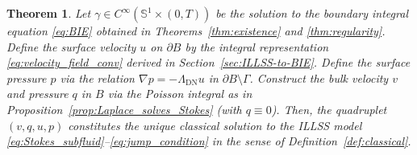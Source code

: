 \documentclass{article}
\newtheorem{theorem}{Theorem}[section]
\theoremstyle{remark}
\theoremstyle{definition}
\numberwithin{equation}{section}
\begin{document}
\begin{theorem}
    \label{thm:existence_ILLSS}
    Let $\gamma \in C^\infty(\mathbb{S}^1 \times (0, T))$ be the solution to the boundary integral equation \eqref{eq:BIE} obtained in Theorems~\ref{thm:existence} and \ref{thm:regularity}.
    Define the surface velocity $u$ on $\partial B$ by the integral representation \eqref{eq:velocity_field_conv} derived in Section~\ref{sec:ILLSS-to-BIE}.
    Define the surface pressure $p$ via the relation $\nabla p = -\Lambda_{\mathrm{DN}}u$ in $\partial B \setminus \Gamma$.
    Construct the bulk velocity $v$ and pressure $q$ in $B$ via the Poisson integral as in Proposition~\ref{prop:Laplace_solves_Stokes} (with $q \equiv 0$).
    Then, the quadruplet $(v, q, u, p)$ constitutes the unique classical solution to the ILLSS model \eqref{eq:Stokes_subfluid}--\eqref{eq:jump_condition} in the sense of Definition~\ref{def:classical}.
\end{theorem}
\end{document}
